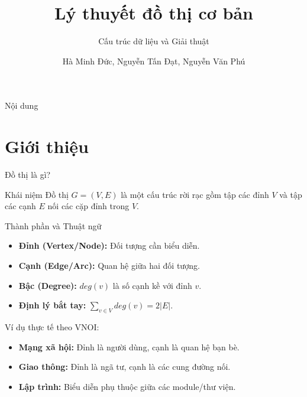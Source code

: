 \documentclass{beamer}
\title{Lý thuyết đồ thị cơ bản}
\subtitle{Cấu trúc dữ liệu và Giải thuật}
\author{Hà Minh Đức, Nguyễn Tấn Đạt, Nguyễn Văn Phú}
\date{}
\begin{document}
\frame{\titlepage}

\begin{frame}{Nội dung}
\tableofcontents
\end{frame}

\section{Giới thiệu}

\begin{frame}{Đồ thị là gì?}

\begin{block}{Khái niệm}
Đồ thị $G = (V, E)$ là một cấu trúc rời rạc gồm tập các đỉnh $V$ và tập các cạnh $E$ nối các cặp đỉnh trong $V$.
\end{block}

\pause

\begin{alertblock}{Thành phần và Thuật ngữ}
\begin{itemize}
\item \textbf{Đỉnh (Vertex/Node):} Đối tượng cần biểu diễn.
\item \textbf{Cạnh (Edge/Arc):} Quan hệ giữa hai đối tượng.
\item \textbf{Bậc (Degree):} $deg(v)$ là số cạnh kề với đỉnh $v$. 
\item \textbf{Định lý bắt tay:} $\sum_{v \in V} deg(v) = 2|E|$.
\end{itemize}
\end{alertblock}

\pause
Ví dụ thực tế theo VNOI:
\begin{itemize}
\item \textbf{Mạng xã hội:} Đỉnh là người dùng, cạnh là quan hệ bạn bè.
\item \textbf{Giao thông:} Đỉnh là ngã tư, cạnh là các cung đường nối.
\item \textbf{Lập trình:} Biểu diễn phụ thuộc giữa các module/thư viện.
\end{itemize}

\end{frame}
\end{document}
